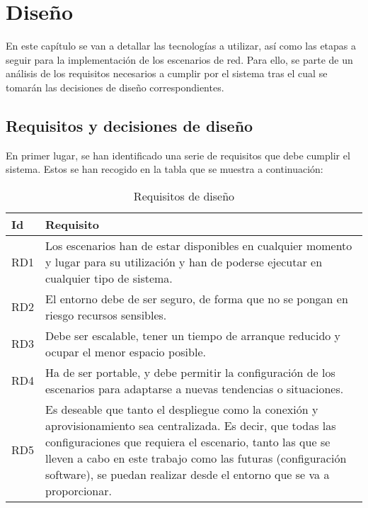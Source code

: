 \chapter{Diseño} \label{ch:dis}
  En este capítulo se van a detallar las tecnologías a utilizar, así como las etapas a seguir para la implementación de los escenarios de red. Para ello, se parte de un análisis de los requisitos necesarios a cumplir por el sistema tras el cual se tomarán las decisiones de diseño correspondientes.

\section{Requisitos y decisiones de diseño} \label{sec:req}
  En primer lugar, se han identificado una serie de requisitos que debe cumplir el sistema. Estos se han recogido en la tabla que se muestra a continuación:

  \begin{table}[h]
    \begin{center}
      \begin{tabular}{ | w{c}{1cm} | m{14cm} | }
        \hline{} \textbf{Id} & \textbf{Requisito} \\ \hline
        RD1 & Los escenarios han de estar disponibles en cualquier momento y lugar para su utilización y han de poderse ejecutar en cualquier tipo de sistema. \\ \hline{}
        RD2 & El entorno debe de ser seguro, de forma que no se pongan en riesgo recursos sensibles. \\ \hline
        RD3 & Debe ser escalable, tener un tiempo de arranque reducido y ocupar el menor espacio posible. \\ \hline{}
        RD4 & Ha de ser portable, y debe permitir la configuración de los escenarios para adaptarse a nuevas tendencias o situaciones.  \\ \hline
        RD5 & Es deseable que tanto el despliegue como la conexión y aprovisionamiento sea centralizada. Es decir, que todas las configuraciones que requiera el escenario, tanto las que se lleven a cabo en este trabajo como las futuras (configuración software), se puedan realizar desde el entorno que se va a proporcionar. \\ \hline
      \end{tabular}
      \caption{Requisitos de diseño}
      \label{tab:objs}
    \end{center}
  \end{table}


